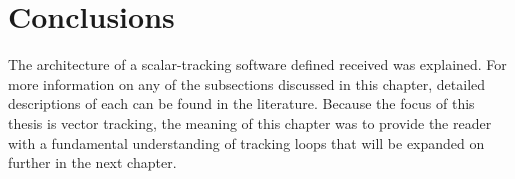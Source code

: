 \section{\textbf{Conclusions}}
The architecture of a scalar-tracking software defined received was explained. For more information on any of the subsections discussed in this chapter, detailed descriptions of each can be found in the literature. Because the focus of this thesis is vector tracking, the meaning of this chapter was to provide the reader with a fundamental understanding of tracking loops that will be expanded on further in the next chapter.